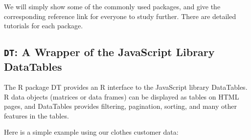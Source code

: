 \documentclass[]{book}
\theoremstyle{definition}
\theoremstyle{definition}
\theoremstyle{remark}
\begin{document}
We will simply show some of the commonly used packages, and give the
corresponding reference link for everyone to study further. There are
detailed tutorials for each package.

\subsection{\texorpdfstring{\texttt{DT}: A Wrapper of the JavaScript
Library
DataTables}{DT: A Wrapper of the JavaScript Library DataTables}}\label{dt-a-wrapper-of-the-javascript-library-datatables}

The R package DT provides an R interface to the JavaScript library
DataTables. R data objects (matrices or data frames) can be displayed as
tables on HTML pages, and DataTables provides filtering, pagination,
sorting, and many other features in the tables.

Here is a simple example using our clothes customer data:
\end{document}
